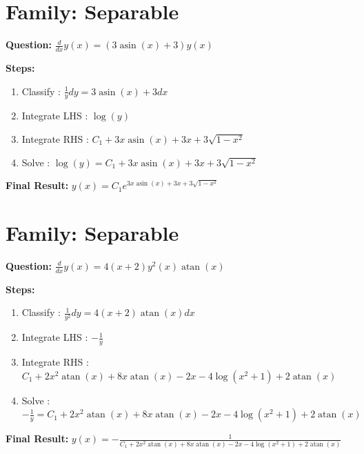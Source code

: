 \documentclass{article}
\begin{document}
\section*{Family: Separable}
\textbf{Question:} $\frac{d}{d x} y{\left(x \right)} = \left(3 \operatorname{asin}{\left(x \right)} + 3\right) y{\left(x \right)}$

\textbf{Steps:}
\begin{enumerate}
\item Classify :  $\frac{1}{y} dy = 3 \operatorname{asin}{\left(x \right)} + 3 dx$
\item Integrate LHS :  $\log{\left(y \right)}$
\item Integrate RHS :  $C_{1} + 3 x \operatorname{asin}{\left(x \right)} + 3 x + 3 \sqrt{1 - x^{2}}$
\item Solve :  $\log{\left(y \right)} = C_{1} + 3 x \operatorname{asin}{\left(x \right)} + 3 x + 3 \sqrt{1 - x^{2}}$
\end{enumerate}
\textbf{Final Result:} $y{\left(x \right)} = C_{1} e^{3 x \operatorname{asin}{\left(x \right)} + 3 x + 3 \sqrt{1 - x^{2}}}$

\section*{Family: Separable}
\textbf{Question:} $\frac{d}{d x} y{\left(x \right)} = 4 \left(x + 2\right) y^{2}{\left(x \right)} \operatorname{atan}{\left(x \right)}$

\textbf{Steps:}
\begin{enumerate}
\item Classify :  $\frac{1}{y^{2}} dy = 4 \left(x + 2\right) \operatorname{atan}{\left(x \right)} dx$
\item Integrate LHS :  $- \frac{1}{y}$
\item Integrate RHS :  $C_{1} + 2 x^{2} \operatorname{atan}{\left(x \right)} + 8 x \operatorname{atan}{\left(x \right)} - 2 x - 4 \log{\left(x^{2} + 1 \right)} + 2 \operatorname{atan}{\left(x \right)}$
\item Solve :  $- \frac{1}{y} = C_{1} + 2 x^{2} \operatorname{atan}{\left(x \right)} + 8 x \operatorname{atan}{\left(x \right)} - 2 x - 4 \log{\left(x^{2} + 1 \right)} + 2 \operatorname{atan}{\left(x \right)}$
\end{enumerate}
\textbf{Final Result:} $y{\left(x \right)} = - \frac{1}{C_{1} + 2 x^{2} \operatorname{atan}{\left(x \right)} + 8 x \operatorname{atan}{\left(x \right)} - 2 x - 4 \log{\left(x^{2} + 1 \right)} + 2 \operatorname{atan}{\left(x \right)}}$
\end{document}
